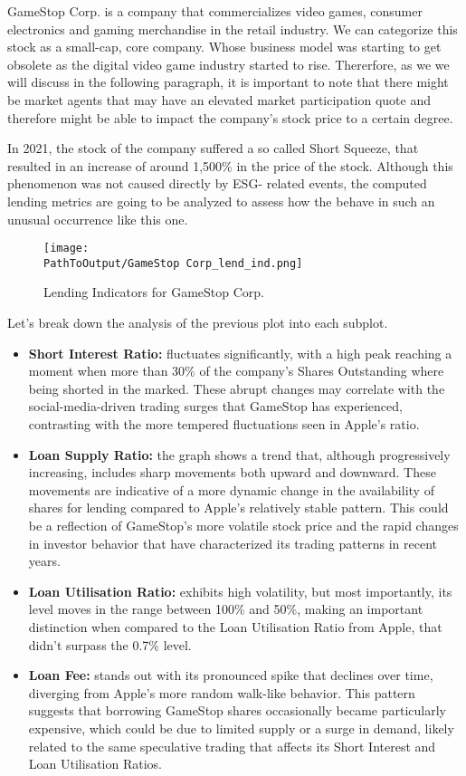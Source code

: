 GameStop Corp. is a company that commercializes video games, consumer electronics and gaming merchandise in the retail industry. We can categorize this stock as a small-cap, core company. Whose business model was starting to get obsolete as the digital video game industry started to rise. Thererfore, as we we will discuss in the following paragraph, it is important to note that there might be market agents that may have an elevated market participation quote and therefore might be able to impact the company's stock price to a certain degree.

In 2021, the stock of the company suffered a so called Short Squeeze, that resulted in an increase of around 1,500\% in the price of the stock. Although this phenomenon was not caused directly by ESG- related events, the computed lending metrics are going to be analyzed to assess how the behave in such an unusual occurrence like this one.

\begin{figure}[H]
	\centering
	\caption{Lending Indicators for GameStop Corp.}
	  \centering
	  \texttt{[image: \\PathToOutput/GameStop Corp\_lend\_ind.png]}
	\label{fig:gamestop_lending_indicators}
\end{figure}

Let's break down the analysis of the previous plot into each subplot.

\begin{itemize}
	\item\textbf{Short Interest Ratio:} fluctuates significantly, with a high peak reaching a moment when more than 30\% of the company's Shares Outstanding where being shorted in the marked. These abrupt changes may correlate with the social-media-driven trading surges that GameStop has experienced, contrasting with the more tempered fluctuations seen in Apple's ratio.
	\item\textbf{Loan Supply Ratio:} the graph shows a trend that, although progressively increasing, includes sharp movements both upward and downward. These movements are indicative of a more dynamic change in the availability of shares for lending compared to Apple's relatively stable pattern. This could be a reflection of GameStop's more volatile stock price and the rapid changes in investor behavior that have characterized its trading patterns in recent years.
	\item\textbf{Loan Utilisation Ratio:} exhibits high volatility, but most importantly, its level moves in the range between 100\% and 50\%, making an important distinction when compared to the Loan Utilisation Ratio from Apple, that didn't surpass the 0.7\% level.
	\item\textbf{Loan Fee:} stands out with its pronounced spike that declines over time, diverging from Apple's more random walk-like behavior. This pattern suggests that borrowing GameStop shares occasionally became particularly expensive, which could be due to limited supply or a surge in demand, likely related to the same speculative trading that affects its Short Interest and Loan Utilisation Ratios.
\end{itemize}

